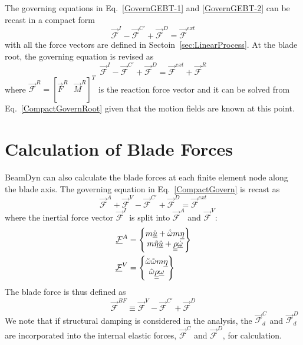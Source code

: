 The governing equations in Eq.~\ref{GovernGEBT-1} and \ref{GovernGEBT-2} can be recast in a compact form
\begin{equation}
    \label{CompactGovern}
    \vec{\mathcal{F}}^I - \vec{\mathcal{F}}^{C\prime} + \vec{\mathcal{F}}^D = \vec{\mathcal{F}}^{ext}
\end{equation}
with all the force vectors are defined in Sectoin~\ref{sec:LinearProcess}.  
At the blade root, the governing equation is revised as
\begin{equation}
    \label{CompactGovernRoot}
    \vec{\mathcal{F}}^I - \vec{\mathcal{F}}^{C\prime} + \vec{\mathcal{F}}^D = \vec{\mathcal{F}}^{ext}+\vec{\mathcal{F}}^R
\end{equation}
where $\vec{\mathcal{F}}^R = \left[ \vec{F}^R~~~\vec{M}^R\right]^T$ is the reaction force vector and it can be solved from Eq.~\ref{CompactGovernRoot} given that the motion fields are known at this point.

\section{Calculation of Blade Forces}
BeamDyn can also calculate the blade forces at each finite element node along the blade axis. 
The governing equation in Eq.~\ref{CompactGovern} is recast as
\begin{equation}
    \label{GovernBF}
     \vec{\mathcal{F}}^A + \vec{\mathcal{F}}^V - \vec{\mathcal{F}}^{C\prime} + \vec{\mathcal{F}}^D = \vec{\mathcal{F}}^{ext}
\end{equation}
where the inertial force vector $\vec{\mathcal{F}}^I$ is split into $\vec{\mathcal{F}}^A$ and $\vec{\mathcal{F}}^V$:
\begin{align}
    \label{mathcalFA}
    \underline{\mathcal{F}}^A &= \begin{Bmatrix}
    m \ddot{\underline{u}} + \dot{\tilde{\omega}}m \underline{\eta}\\
    m \tilde{\eta} \ddot{\underline{u}} + \underline{\underline{\rho}} \dot{\underline{\omega}}
    \end{Bmatrix} \\
    \label{mathcalFV}
    \underline{\mathcal{F}}^V &= \begin{Bmatrix}
    \tilde{\omega} \tilde{\omega} m \underline{\eta}\\
     \tilde{\omega} \underline{\underline{\rho}} \underline{\omega}
    \end{Bmatrix} \\    
\end{align}
The blade force is thus defined as
\begin{equation}
    \label{BladeForce}
    \vec{\mathcal{F}}^{BF} \equiv \vec{\mathcal{F}}^V - \vec{\mathcal{F}}^{C\prime} + \vec{\mathcal{F}}^D
\end{equation}
We note that if structural damping is considered in the analysis, the $\vec{\mathcal{F}}^{C}_d$ and $\vec{\mathcal{F}}^D_d$ are incorporated into the internal elastic forces, $\vec{\mathcal{F}}^C$ and $\vec{\mathcal{F}}^D$, for calculation.
